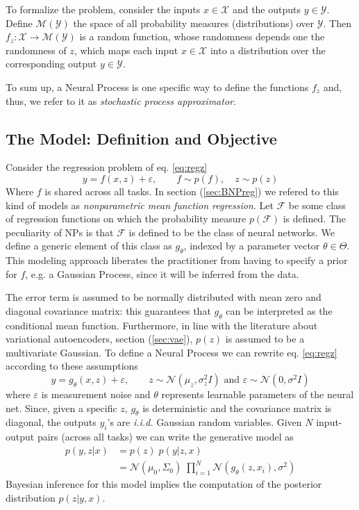 To formalize the problem, consider the inputs $x\in\mathcal{X}$ and the outputs $y\in\mathcal{Y}$. Define $\mathcal{M}(\mathcal{Y})$ the space of all probability measures (distributions) over $\mathcal{Y}$. Then $f_z: \mathcal{X}\to\mathcal{M}(\mathcal{Y})$ is a random function, whose randomness depends one the randomness of $z$, which maps each input $x\in\mathcal{X}$ into a distribution over the corresponding output $y\in\mathcal{Y}$.  

To sum up, a Neural Process is one specific way to define the functions $f_z$ and, thus, we refer to it as \textit{stochastic process approximator}. 



\subsection{The Model: Definition and Objective}
Consider the regression problem of eq. \eqref{eq:regz}
\begin{equation*}
    y = f(x, z) + \varepsilon, \qquad f \sim p(f), \quad z \sim p(z)
\end{equation*}
Where $f$ is shared across all tasks. In section (\cref{sec:BNPreg}) we refered to this kind of models as \textit{nonparametric mean function regression}. Let $\mathcal{F}$ be some class of regression functions on which the probability measure $p(\mathcal{F})$ is defined. The peculiarity of NPs is that $\mathcal{F}$ is defined to be the class of neural networks. We define a generic element of this class as $g_\theta$, indexed by a parameter vector $\theta\in\Theta$. This modeling approach liberates the practitioner from having to specify a prior for $f$, e.g. a Gaussian Process, since it will be inferred from the data.

The error term is assumed to be normally distributed with mean zero and diagonal covariance matrix: this guarantees that $g_\theta$ can be interpreted as the conditional mean function. Furthermore, in line with the literature about variational autoencoders, section (\cref{sec:vae}), $p(z)$ is assumed to be a multivariate Gaussian. To define a Neural Process we can rewrite eq. \eqref{eq:regz} according to these assumptions 
\begin{equation*}
    y = g_\theta(x,z) + \varepsilon, \qquad \text{$z\sim \mathcal{N}\left(\mu_z,\sigma_z^2 I\right)$ and $\varepsilon\sim\mathcal{N}\left(0,\sigma^2 I\right)$}
\end{equation*}
where $\varepsilon$ is measurement noise and $\theta$ represents learnable parameters of the neural net. Since, given a specific $z$, $g_\theta$ is deterministic and the covariance matrix is diagonal, the outputs $y_i$'s are \textit{i.i.d.} Gaussian random variables. Given $N$ input-output pairs (across all tasks) we can write the generative model as
\begin{align*}
    p(y,z|x) &= p(z) \; p(y|z, x)\\
             &= \mathcal{N}\left(\mu_0,\Sigma_0\right) \; \prod_{i=1}^{N}\mathcal{N}\left(g_\theta(z, x_i), \sigma^2\right)
\end{align*}
Bayesian inference for this model implies the computation of the posterior distribution $p(z|y,x)$. 

